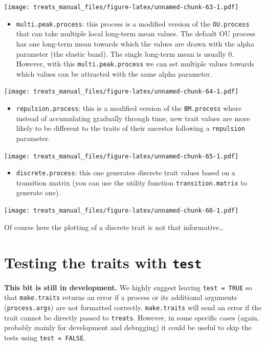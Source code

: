 \documentclass[
]{book}
\providecommand{\tightlist}{%
  \setlength{\itemsep}{0pt}\setlength{\parskip}{0pt}}
\begin{document}
\texttt{[image: treats\_manual\_files/figure-latex/unnamed-chunk-63-1.pdf]}

\begin{itemize}
\tightlist
\item
  \texttt{multi.peak.process}: this process is a modified version of the \texttt{OU.process} that can take multiple local long-term mean values. The default OU process has one long-term mean towards which the values are drawn with the alpha parameter (the elastic band). The single long-term mean is usually 0. However, with this \texttt{multi.peak.process} we can set multiple values towards which values can be attracted with the same alpha parameter.
\end{itemize}

\texttt{[image: treats\_manual\_files/figure-latex/unnamed-chunk-64-1.pdf]}

\begin{itemize}
\tightlist
\item
  \texttt{repulsion.process}: this is a modified version of the \texttt{BM.process} where instead of accumulating gradually through time, new trait values are more likely to be different to the traits of their ancestor following a \texttt{repulsion} parameter.
\end{itemize}

\texttt{[image: treats\_manual\_files/figure-latex/unnamed-chunk-65-1.pdf]}

\begin{itemize}
\tightlist
\item
  \texttt{discrete.process}: this one generates discrete trait values based on a transition matrix (you can use the utility function \texttt{transition.matrix} to generate one).
\end{itemize}

\texttt{[image: treats\_manual\_files/figure-latex/unnamed-chunk-66-1.pdf]}

Of course here the plotting of a discrete trait is not that informative\ldots{}

\hypertarget{testing-the-traits-with-test}{%
\section{\texorpdfstring{Testing the traits with \texttt{test}}{Testing the traits with test}}\label{testing-the-traits-with-test}}

\textbf{This bit is still in development.}
We highly suggest leaving \texttt{test\ =\ TRUE} so that \texttt{make.traits} returns an error if a process or its additional arguments (\texttt{process.args}) are not formatted correctly.
\texttt{make.traits} will send an error if the trait cannot be directly passed to \texttt{treats}.
However, in some specific cases (again, probably mainly for development and debugging) it could be useful to skip the tests using \texttt{test\ =\ FALSE}.
\end{document}

